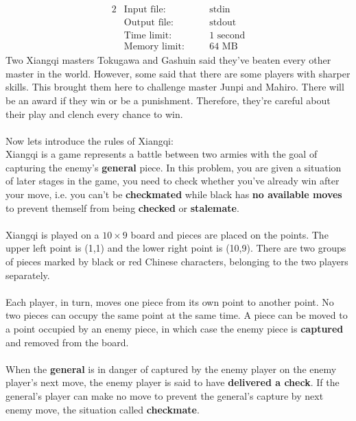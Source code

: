 \documentclass[12pt,a4paper]{article}
\begin{document}
\begin{alignat*} {2}
 &   \text{Input file:}   \quad     &&\text{stdin}\\
 &   \text{Output file:}  \quad     &&\text{stdout}\\
 &   \text{Time limit:}   \quad     &&\text{1 second}\\
 &   \text{Memory limit:} \quad     &&\text {64 MB}
\end{alignat*}
\noindent
Two Xiangqi masters Tokugawa and Gashuin said they've beaten every other master in the world. However, some said that there
are some players with sharper skills. This brought them here
to challenge master Junpi and Mahiro. There will be an award if they win or be a punishment.
Therefore, they're careful about their play and clench every chance to win.
\\\\
\noindent
Now let\textquotesingle s introduce the rules of Xiangqi:
\\\noindent
Xiangqi is a game represents a battle between two armies with the goal
of capturing the enemy's \textbf{general} piece. In this problem, you are
given a situation of later stages in the game, you need to check
whether you've already win after your move, i.e. you can't be \textbf{checkmated} while black has \textbf{no available moves} to prevent themself from being \textbf{checked} or \textbf{stalemate}.
\\\\
\noindent
Xiangqi is played on a $10\times9$ board and pieces are
placed on the points. The upper left point is (1,1) and
the lower right point is (10,9). There are two groups of pieces marked
by black or red Chinese characters, belonging to the two players
separately.
\\\\
\noindent
Each player, in turn, moves one piece from its own point to another point. No two pieces can occupy the
same point at the same time. A piece can be moved to a point occupied
by an enemy piece, in which case the enemy piece is \textbf{captured} and
removed from the board. 
\\\\
\noindent
When the \textbf{general} is in danger of captured
by the enemy player on the enemy player's next move, the enemy player is
said to have \textbf{delivered a check}. If the general's player can make no
move to prevent the general's capture by next enemy move, the situation called \textbf{checkmate}.
\\\\
\end{document}
